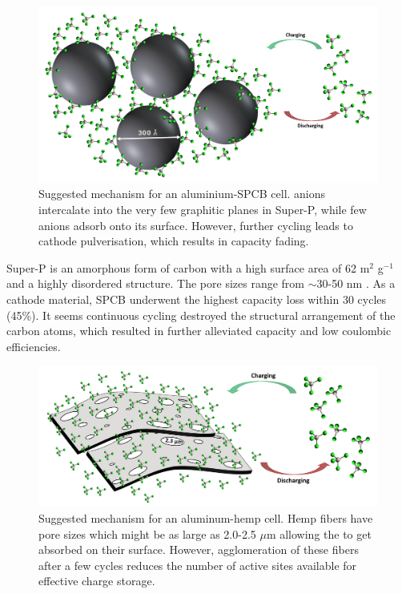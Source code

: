  \begin{figure}[tbh!]
  \centering
  \includegraphics[width=\textwidth]{Figures/chap5fig/superpmech}
    \caption{Suggested mechanism for an aluminium-SPCB cell.  anions intercalate into the very few graphitic planes in Super-P, while few anions adsorb onto its surface. However, further cycling leads to cathode pulverisation, which results in capacity fading.}
  \label{Figures/chap5figs:superPmech}
\end{figure}

Super-P is an amorphous form of carbon with a high surface area of 62 m$^2$ g$^{-1}$ and a highly disordered structure. The pore sizes range from $\sim$30-50 nm \cite{younesi_analysis_2015}. As a cathode material, SPCB underwent the highest capacity loss within 30 cycles (45\%). It seems continuous cycling destroyed the structural arrangement of the carbon atoms, which resulted in further alleviated capacity and low coulombic efficiencies.

 \begin{figure}[tbh!]
  \centering
  \includegraphics[width=\textwidth]{Figures/chap5fig/hempmech}
    \caption{Suggested mechanism for an aluminum-hemp cell. Hemp fibers have pore sizes which might be as large as 2.0-2.5 $\mu$m allowing the  to get absorbed on their surface. However, agglomeration of these fibers after a few cycles reduces the number of active sites available for effective charge storage.}
  \label{Figures/chap5fig:hempmech}
\end{figure}

